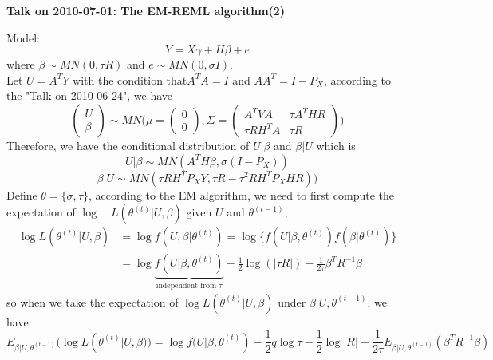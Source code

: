 \documentclass[12pt]{article}
\begin{document}
    \begin{center}
        {\bf Talk on 2010-07-01: The EM-REML algorithm(2)}
    \end{center}
    Model:
    \begin{equation*}
        Y=X\gamma+H\beta+e
    \end{equation*}
    where $\beta\sim MN(0,\tau R)$ and $e\sim MN(0,\sigma I)$.\\
    Let $U=A^TY$ with the condition that$A^TA=I$ and $AA^T=I-P_X$, according to the "Talk on 2010-06-24", we have
    \begin{equation*}
    \begin{pmatrix}
    U\\
    \beta
    \end{pmatrix}
    \sim MN\Big( \mu=\begin{pmatrix}
    0\\
    0
    \end{pmatrix}
    ,\Sigma=\begin{pmatrix}
    A^TVA&\tau A^THR\\
    \tau RH^TA&\tau R
    \end{pmatrix}
    \Big)
    \end{equation*}
    Therefore, we have the conditional distribution of $U|\beta$ and $\beta|U$ which is 
    \begin{equation*}
    U|\beta\sim MN(A^TH\beta,\sigma(I-P_X))
    \end{equation*}
    \begin{equation*}
    \beta|U\sim MN(\tau RH^TP_XY,\tau R-\tau^2 RH^TP_XHR))
    \end{equation*}
    Define $\theta=\{\sigma, \tau\}$, according to the EM algorithm, we need to first compute the expectation of $\log\quad L(\theta^{(t)}|U,\beta)$ given $U$ and $\theta^{(t-1)}$,
    \begin{equation*}
    \begin{split}
    \log L(\theta^{(t)}|U,\beta)&=\log f(U,\beta|\theta^{(t)})=\log\{f(U|\beta,\theta^{(t)})f(\beta|\theta^{(t)})\}\\
    &=\log\underbrace{f(U|\beta,\theta^{(t)})}_{\textrm{independent from }\tau}-\frac{1}{2}\log(|\tau R|)-\frac{1}{2\tau}\beta^TR^{-1}\beta
    \end{split}
    \end{equation*}
    so when we take the expectation of $\log L(\theta^{(t)}|U,\beta)$ under $\beta|U,\theta^{(t-1)}$, we have
    \begin{equation}
        E_{\beta|U,\theta^{(t-1)}}(\log L(\theta^{(t)}|U,\beta))=\log f(U|\beta,\theta^{(t)})-\frac{1}{2} q\log\tau-\frac{1}{2}\log|R|-\frac{1}{2\tau}E_{\beta|U,\theta^{(t-1)}}(\beta^TR^{-1}\beta)
    \end{equation}
\end{document}
